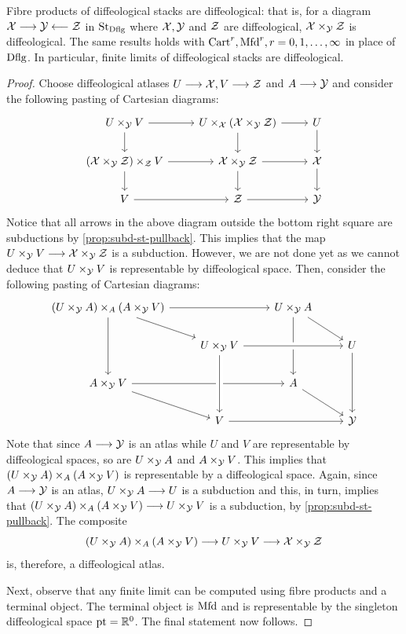 \documentclass[11pt]{amsart}
\begin{document}
\begin{thm}\label{thm:fin-lim-dflg-st}
Fibre products of diffeological stacks are diffeological: that is, for a diagram
$\mcX \to \mcY \ot \mcZ$ in $\mathrm{St}_{\mathrm{Dflg}}$ where $\mathcal{X}, \mathcal{Y}$ and $\mathcal{Z}$ are
diffeological, $\mathcal{X} \times_\mathcal{Y} \mathcal{Z}$ is diffeological.
The same results holds with $\mathrm{Cart}^r, \mathrm{Mfd}^r, r = 0, 1, \dots, \infty$ in place of
$\mathrm{Dflg}$.
In particular, finite limits of diffeological stacks are diffeological.
\end{thm}
\begin{proof}
Choose diffeological atlases $U \to \mcX, V \to \mcZ$ and $A \to \mcY$ and consider the following
pasting of Cartesian diagrams:
\[\begin{tikzcd}
U \times_\mcY V \ar[r] \ar[d] &
U \times_\mcX (\mcX \times_\mcY \mcZ) \ar[r] \ar[d] &
U \ar[d] \\
(\mcX \times_\mcY \mcZ) \times_\mcZ V \ar[r] \ar[d] &
\mcX \times_\mcY \mcZ \ar[r] \ar[d] &
\mcX \ar[d] \\
V \ar[r] & \mcZ \ar[r] & \mcY
\end{tikzcd}\]
Notice that all arrows in the above diagram outside the bottom right square are subductions
by \cref{prop:subd-st-pullback}. This implies that the map
$U \times_\mcY V \to \mcX \times_\mcY \mcZ$ is a subduction. However, we are not
done yet as we cannot deduce that $U \times_\mathcal{Y} V$ is representable by diffeological space.
Then, consider the following pasting of Cartesian diagrams:
\[\begin{tikzcd}
(U \times_\mcY A) \times_A (A \times_\mcY V) \ar[rr] \ar[rd] \ar[dd] & &
U \times_\mcY A \ar[rd] \ar[dd] & \\
& U \times_\mcY V \ar[rr, crossing over] & & U \ar[dd] \\
A \times_\mcY V \ar[rr] \ar[rd] & & A \ar[rd] & \\
& V \ar[rr] \ar[from=uu, crossing over] & & \mcY
\end{tikzcd}\]
Note that since $A \to \mcY$ is an atlas while $U$ and $V$ are representable by diffeological
spaces, so are $U \times_\mathcal{Y} A$ and $A \times_\mathcal{Y} V$.
This implies that $(U \times_\mathcal{Y} A) \times_A (A \times_\mathcal{Y} V)$ is representable by
a diffeological space.
Again, since $A \to \mcY$ is an atlas, $U \times_\mcY A \to U$ is a subduction and this, in turn,
implies that $(U \times_\mcY A) \times_A (A \times_\mcY V) \to U \times_\mcY V$ is a subduction, by
\cref{prop:subd-st-pullback}. The composite
\[
(U \times_\mcY A) \times_A (A \times_\mcY V) \to U \times_\mcY V \to \mcX \times_\mcY \mcZ
\]
is, therefore, a diffeological atlas.

Next, observe that any finite limit can be computed using
fibre products and a terminal object.
The terminal object is $\mathrm{Mfd}$ and is representable by the singleton diffeological space
$\mathrm{pt} = \mathbb{R}^0$. The final statement now follows.
\end{proof}
\end{document}
